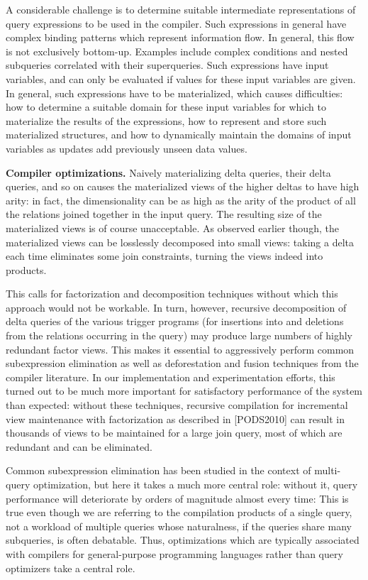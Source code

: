 A considerable challenge is to determine suitable intermediate representations of query expressions to be used in the compiler. Such expressions in general have complex binding patterns which represent information flow. In general, this flow is not exclusively bottom-up.
Examples include complex conditions and nested subqueries correlated with their superqueries. Such expressions have input variables, and can only be evaluated if values for these input variables are given. In general, such expressions have to be materialized, which causes difficulties: how to determine a suitable domain for these input variables for which to materialize the results of the expressions, how to represent and store such materialized structures, and how to dynamically maintain the domains of input variables as updates add previously unseen data values.


{\bf Compiler optimizations.}
%
Naively materializing delta queries, their delta queries, and so on causes the materialized views of the higher deltas to have high arity: in fact, the dimensionality can be as high as the arity of the product of all the relations joined together in the input query. The resulting size of the materialized views is of course unacceptable. As observed earlier \cite{ahmad-vldb:09, koch-pods:10} though, the materialized views can be losslessly decomposed into small views: taking a delta each time eliminates some join constraints, turning the views indeed into products.

This calls for factorization and decomposition techniques without which this approach would not be workable. In turn, however, recursive decomposition of delta queries of the various trigger programs (for insertions into and deletions from the relations occurring in the query) may produce large numbers of highly redundant factor views. This makes it essential to aggressively perform common subexpression elimination as well as deforestation and fusion techniques from the compiler literature. In our implementation and experimentation efforts, this turned out to be much more important for satisfactory performance of the system than expected: without these techniques, recursive compilation for incremental view maintenance with factorization as described in [PODS2010] can result in thousands of views to be maintained for a large join query, most of which are redundant and can be eliminated.

Common subexpression elimination has been studied in the context of multi-query optimization, but here it takes a much more central role: without it, query performance will deteriorate by orders of magnitude almost every time: This is true even though we are referring to the compilation products of a single query, not a workload of multiple queries whose naturalness, if the queries share many subqueries, is often debatable. Thus, optimizations which are typically associated with compilers for general-purpose programming languages rather than query optimizers take a central role.

